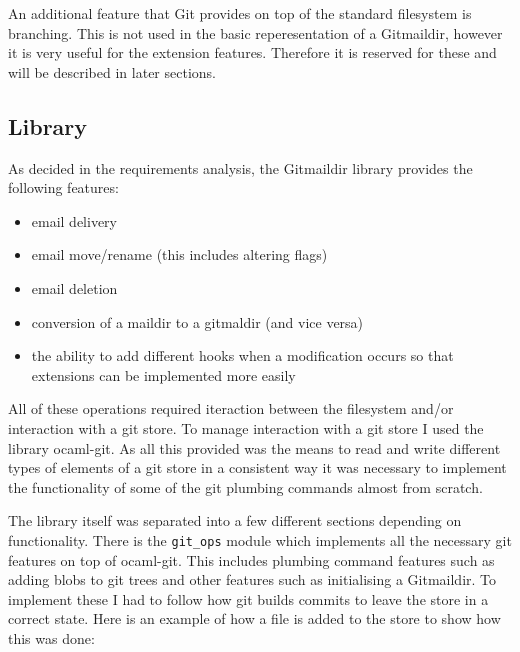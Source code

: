 An additional feature that Git provides on top of the standard filesystem is branching. This is not used in the basic reperesentation of a Gitmaildir, however it is very useful for the extension features. Therefore it is reserved for these and will be described in later sections. 

\subsection{Library}

As decided in the requirements analysis, the Gitmaildir library provides the following features:

\begin{itemize}
\item email delivery
\item email move/rename (this includes altering flags)
\item email deletion
\item conversion of a maildir to a gitmaldir (and vice versa)
\item the ability to add different hooks when a modification occurs so that extensions can be implemented more easily
\end{itemize}

All of these operations required iteraction between the filesystem and/or interaction with a git store. To manage interaction with a git store I used the library ocaml-git. As all this provided was the means to read and write different types of elements of a git store in a consistent way it was necessary to implement the functionality of some of the git plumbing commands almost from scratch.

The library itself was separated into a few different sections depending on functionality. There is the \texttt{git\_ops} module which implements all the necessary git features on top of ocaml-git. This includes plumbing command features such as adding blobs to git trees and other features such as initialising a Gitmaildir. To implement these I had to follow how git builds commits to leave the store in a correct state. Here is an example of how a file is added to the store to show how this was done:

